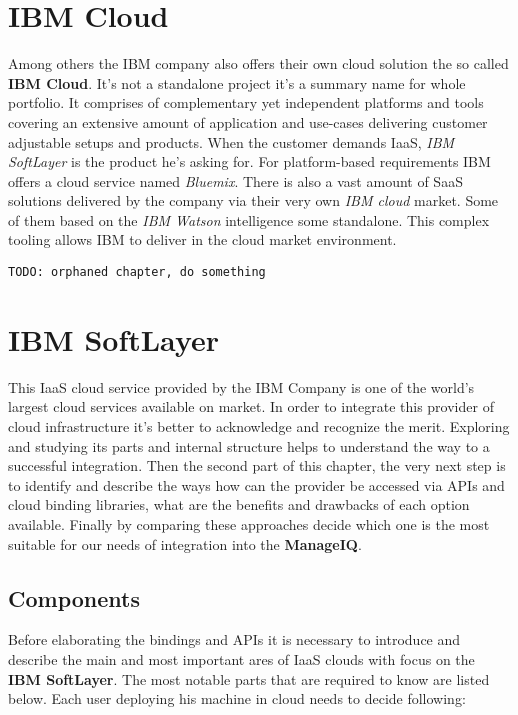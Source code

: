 \chapter{IBM Cloud}
\label{chap:IBM Cloud}

Among others the IBM company also offers their own cloud solution the so called \textbf{IBM Cloud}. It's not a standalone project it's a summary name for whole portfolio. It comprises of complementary yet independent platforms and tools covering an extensive amount of application and use-cases delivering customer adjustable setups and products. When the customer demands IaaS, \emph{IBM SoftLayer} is the product he's asking for. For platform-based requirements IBM offers a cloud service named \emph{Bluemix}. There is also a vast amount of SaaS solutions delivered by the company via their very own \emph{IBM cloud} market. Some of them based on the \emph{IBM Watson} intelligence some standalone. This complex tooling allows IBM to deliver in the cloud market environment.

\noindent\texttt{\color{OliveGreen}TODO: orphaned chapter, do something}

\chapter{IBM SoftLayer}
\label{chap:IBM SoftLayer}

This IaaS cloud service provided by the IBM Company is one of the world's largest cloud services available on market. In order to integrate this provider of cloud infrastructure it's better to acknowledge and recognize the merit. Exploring and studying its parts and internal structure helps to understand the way to a successful integration. Then the second part of this chapter, the very next step is to identify and describe the ways how can the provider be accessed via APIs and cloud binding libraries, what are the benefits and drawbacks of each option available. Finally by comparing these approaches decide which one is the most suitable for our needs of integration into the \textbf{ManageIQ}.

\section{Components}
\label{sec:Components}

Before elaborating the bindings and APIs it is necessary to introduce and describe the main and most important ares of IaaS clouds with focus on the \textbf{IBM SoftLayer}. The most notable parts that are required to know are listed below. Each user deploying his machine in cloud needs to decide following:

